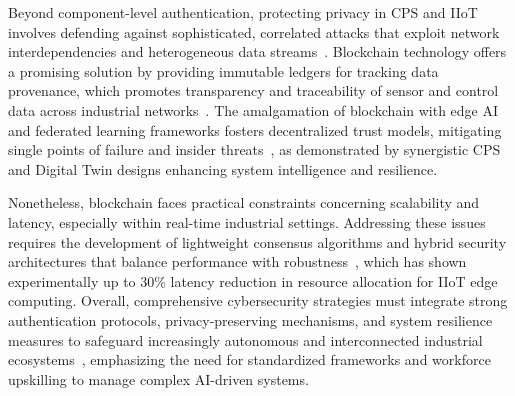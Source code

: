 \documentclass[sigconf]{acmart}
\begin{document}
Beyond component-level authentication, protecting privacy in CPS and IIoT involves defending against sophisticated, correlated attacks that exploit network interdependencies and heterogeneous data streams~\cite{ref15}. Blockchain technology offers a promising solution by providing immutable ledgers for tracking data provenance, which promotes transparency and traceability of sensor and control data across industrial networks~\cite{ref20}. The amalgamation of blockchain with edge AI and federated learning frameworks fosters decentralized trust models, mitigating single points of failure and insider threats~\cite{ref22}, as demonstrated by synergistic CPS and Digital Twin designs enhancing system intelligence and resilience.

Nonetheless, blockchain faces practical constraints concerning scalability and latency, especially within real-time industrial settings. Addressing these issues requires the development of lightweight consensus algorithms and hybrid security architectures that balance performance with robustness~\cite{ref31}, which has shown experimentally up to 30\% latency reduction in resource allocation for IIoT edge computing. Overall, comprehensive cybersecurity strategies must integrate strong authentication protocols, privacy-preserving mechanisms, and system resilience measures to safeguard increasingly autonomous and interconnected industrial ecosystems~\cite{ref32}, emphasizing the need for standardized frameworks and workforce upskilling to manage complex AI-driven systems.
\end{document}
